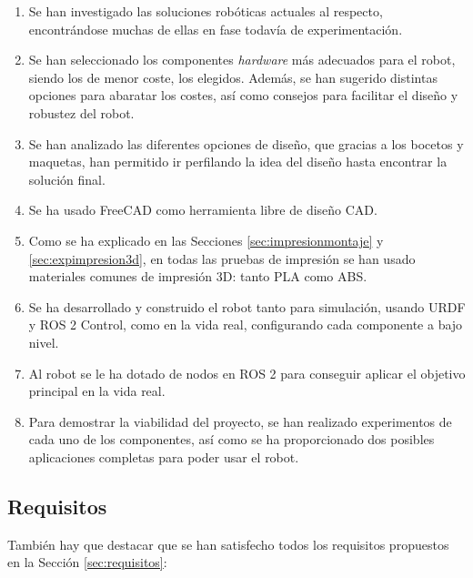 \begin{enumerate}
	\item Se han investigado las soluciones robóticas actuales al respecto, encontrándose muchas de ellas en fase todavía de experimentación.
	\item Se han seleccionado los componentes \textit{hardware} más adecuados para el robot, siendo  los de menor coste, los elegidos. Además, se han sugerido distintas opciones para abaratar los costes, así como consejos para facilitar el diseño y robustez del robot. 
	\item Se han analizado las diferentes opciones de diseño, que gracias a los bocetos y maquetas, han permitido ir perfilando la idea del diseño hasta encontrar la solución final.
	\item Se ha usado FreeCAD como herramienta libre de diseño CAD.
	\item Como se ha explicado en las Secciones \ref{sec:impresionmontaje} y \ref{sec:expimpresion3d}, en todas las pruebas de impresión se han usado materiales comunes de impresión 3D: tanto PLA como ABS.
	\item Se ha desarrollado  y construido el robot tanto para simulación, usando URDF y ROS 2 Control, como en la vida real, configurando cada componente a bajo nivel.
	\item Al robot se le ha dotado de nodos en ROS 2 para conseguir aplicar el objetivo principal en la vida real.
	\item Para demostrar la viabilidad del proyecto, se han realizado experimentos de cada uno de los componentes, así como se ha proporcionado dos posibles aplicaciones completas para poder usar el robot.  
\end{enumerate}

\subsection{Requisitos}

También hay que destacar que se han satisfecho todos los requisitos propuestos en la Sección \ref{sec:requisitos}:

